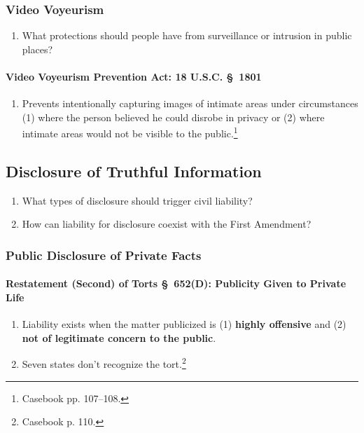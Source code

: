 \subsubsection{Video Voyeurism}

\begin{enumerate}
    \item What protections should people have from surveillance or intrusion in 
    public places?
\end{enumerate}

\paragraph{Video Voyeurism Prevention Act: 18 U.S.C. \S\ 1801}

\begin{enumerate}
    \item Prevents intentionally capturing images of intimate areas under 
    circumstances (1) where the person believed he could disrobe in privacy or 
    (2) where intimate areas would not be visible to the 
    public.\footnote{Casebook pp. 107--108.}
\end{enumerate}

\subsection{Disclosure of Truthful Information}

\begin{enumerate}
    \item What types of disclosure should trigger civil liability?
    \item How can liability for disclosure coexist with the First Amendment?
\end{enumerate}

\subsubsection{Public Disclosure of Private Facts}

\paragraph{Restatement (Second) of Torts \S\ 652(D): Publicity Given to Private 
Life}

\begin{enumerate}
    \item Liability exists when the matter publicized is (1) \textbf{highly 
    offensive} and (2) \textbf{not of legitimate concern to the public}.
    \item Seven states don't recognize the tort.\footnote{Casebook p. 110.}
\end{enumerate}

